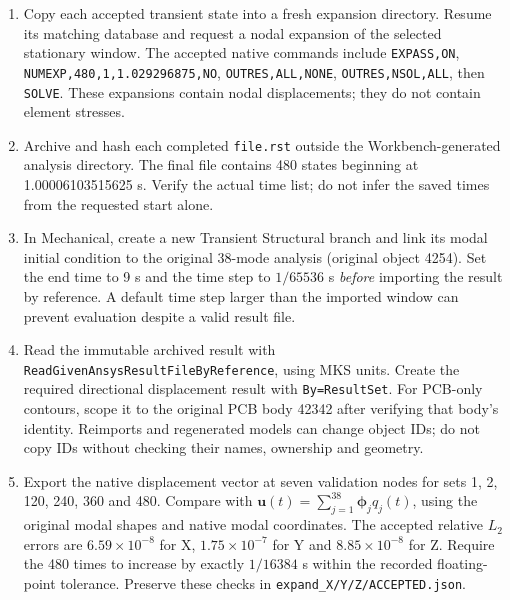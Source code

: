 \documentclass[10pt,a4paper]{article}
\begin{document}
\begin{enumerate}
\item Copy each accepted transient state into a fresh expansion directory. Resume its matching database and request a nodal expansion of the selected stationary window. The accepted native commands include \texttt{EXPASS,ON}, \texttt{NUMEXP,480,1,1.029296875,NO}, \texttt{OUTRES,ALL,NONE}, \texttt{OUTRES,NSOL,ALL}, then \texttt{SOLVE}. These expansions contain nodal displacements; they do not contain element stresses.
\item Archive and hash each completed \texttt{file.rst} outside the Workbench-generated analysis directory. The final file contains 480 states beginning at 1.00006103515625 s. Verify the actual time list; do not infer the saved times from the requested start alone.
\item In Mechanical, create a new Transient Structural branch and link its modal initial condition to the original 38-mode analysis (original object 4254). Set the end time to 9 s and the time step to $1/65536$ s \emph{before} importing the result by reference. A default time step larger than the imported window can prevent evaluation despite a valid result file.
\item Read the immutable archived result with \texttt{ReadGivenAnsysResultFileByReference}, using MKS units. Create the required directional displacement result with \texttt{By=ResultSet}. For PCB-only contours, scope it to the original PCB body 42342 after verifying that body's identity. Reimports and regenerated models can change object IDs; do not copy IDs without checking their names, ownership and geometry.
\item Export the native displacement vector at seven validation nodes for sets 1, 2, 120, 240, 360 and 480. Compare with $\mathbf{u}(t)=\sum_{j=1}^{38}\boldsymbol{\phi}_j q_j(t)$, using the original modal shapes and native modal coordinates. The accepted relative $L_2$ errors are $6.59\times10^{-8}$ for X, $1.75\times10^{-7}$ for Y and $8.85\times10^{-8}$ for Z. Require the 480 times to increase by exactly $1/16384$ s within the recorded floating-point tolerance. Preserve these checks in \texttt{expand\_X/Y/Z/ACCEPTED.json}.
\end{enumerate}
\end{document}

